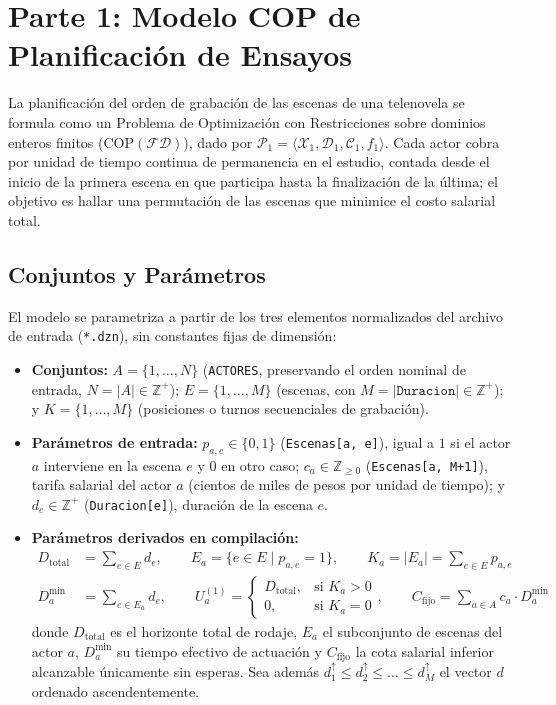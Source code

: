 \section{Parte 1: Modelo COP de Planificación de Ensayos}
\label{sec:modelo_parte1}

La planificación del orden de grabación de las escenas de una telenovela se formula como un Problema de Optimización con Restricciones sobre dominios enteros finitos ($\text{COP}(\mathcal{FD})$), dado por $\mathcal{P}_1 = \langle \mathcal{X}_1, \mathcal{D}_1, \mathcal{C}_1, f_1 \rangle$. Cada actor cobra por unidad de tiempo continua de permanencia en el estudio, contada desde el inicio de la primera escena en que participa hasta la finalización de la última; el objetivo es hallar una permutación de las escenas que minimice el costo salarial total.

\subsection{Conjuntos y Parámetros}

El modelo se parametriza a partir de los tres elementos normalizados del archivo de entrada (\texttt{*.dzn}), sin constantes fijas de dimensión:
\begin{itemize}
    \item \textbf{Conjuntos:} $A = \{1, \dots, N\}$ (\texttt{ACTORES}, preservando el orden nominal de entrada, $N = |A| \in \mathbb{Z}^+$); $E = \{1, \dots, M\}$ (escenas, con $M = |\texttt{Duracion}| \in \mathbb{Z}^+$); y $K = \{1, \dots, M\}$ (posiciones o turnos secuenciales de grabación).
    \item \textbf{Parámetros de entrada:} $p_{a,e} \in \{0, 1\}$ (\texttt{Escenas[a, e]}), igual a $1$ si el actor $a$ interviene en la escena $e$ y $0$ en otro caso; $c_a \in \mathbb{Z}_{\ge 0}$ (\texttt{Escenas[a, M+1]}), tarifa salarial del actor $a$ (cientos de miles de pesos por unidad de tiempo); y $d_e \in \mathbb{Z}^+$ (\texttt{Duracion[e]}), duración de la escena $e$.
    \item \textbf{Parámetros derivados en compilación:}
    \begin{align}
        D_{\text{total}} &= \sum_{e \in E} d_e, \qquad
        E_a = \{e \in E \mid p_{a,e} = 1\}, \qquad
        K_a = |E_a| = \sum_{e \in E} p_{a,e} \label{eq:p1_derivados1} \\
        D^{\min}_a &= \sum_{e \in E_a} d_e, \qquad
        U^{(1)}_a = \begin{cases} D_{\text{total}}, & \text{si } K_a > 0 \\ 0, & \text{si } K_a = 0 \end{cases}, \qquad
        C_{\text{fijo}} = \sum_{a \in A} c_a \cdot D^{\min}_a \label{eq:p1_derivados2}
    \end{align}
    donde $D_{\text{total}}$ es el horizonte total de rodaje, $E_a$ el subconjunto de escenas del actor $a$, $D^{\min}_a$ su tiempo efectivo de actuación y $C_{\text{fijo}}$ la cota salarial inferior alcanzable únicamente sin esperas. Sea además $d^{\uparrow}_1 \le d^{\uparrow}_2 \le \dots \le d^{\uparrow}_M$ el vector $d$ ordenado ascendentemente.
\end{itemize}

